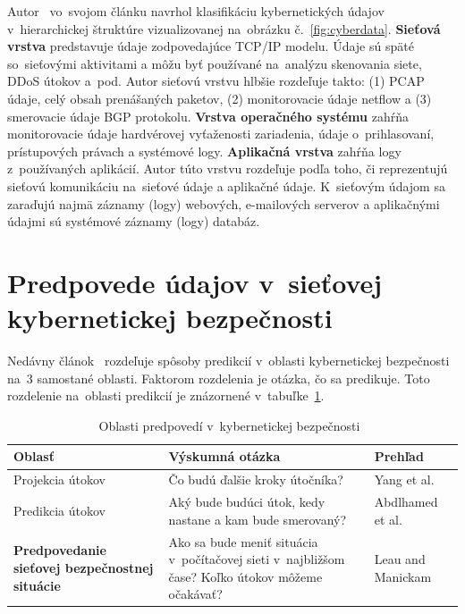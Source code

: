 \documentclass[thesismargins, thesislinespacing, openright, upjsfrontpage]{rnthesis}
\begin{document}
Autor~\cite{wang2013cyber} vo~svojom článku navrhol klasifikáciu kybernetických údajov v~hierarchickej štruktúre vizualizovanej na~obrázku č.~\ref{fig:cyberdata}. \textbf{Sieťová vrstva} predstavuje údaje zodpovedajúce TCP/IP modelu. Údaje sú späté so~sieťovými aktivitami a môžu byť používané na~analýzu skenovania siete, DDoS útokov a~pod. Autor sieťovú vrstvu hlbšie rozdeľuje takto: (1) PCAP údaje, celý obsah prenášaných paketov, (2) monitorovacie údaje netflow a (3) smerovacie údaje BGP protokolu. \textbf{Vrstva operačného systému} zahŕňa monitorovacie údaje hardvérovej vyťaženosti zariadenia, údaje o~prihlasovaní, prístupových právach a systémové logy. \textbf{Aplikačná vrstva} zahŕňa logy z~používaných aplikácií. Autor túto vrstvu rozdeľuje podľa toho, či reprezentujú sieťovú komunikáciu na~sieťové údaje a aplikačné údaje. K~sieťovým údajom sa zaraďujú najmä záznamy (logy) webových, e-mailových serverov a aplikačnými údajmi sú systémové záznamy (logy) databáz.


\section{Predpovede údajov v~sieťovej kybernetickej bezpečnosti} \label{discipliny}

Nedávny článok~\cite{Husak2018survey} rozdeľuje spôsoby predikcií v~oblasti kybernetickej bezpečnosti na~3 samostané oblasti. Faktorom rozdelenia je otázka, čo sa predikuje. Toto rozdelenie na~oblasti predikcií je znázornené v~tabuľke~\ref{Tab:husak}.

\begin{table}
\begin{center}
\begin{tabular}{ | p{4cm} | p{6cm} | p{3cm} | }
\hline
\textbf{Oblasť} & \textbf{Výskumná otázka} & \textbf{Prehľad} \\
\hline
\hline Projekcia útokov & Čo budú ďalšie kroky útočníka? & Yang et al.~\cite{Yang2014} \\
\hline Predikcia útokov & Aký bude budúci útok, kedy nastane a kam bude smerovaný? & Abdlhamed et al.~\cite{Abdlhamed2017} \\
\hline \textbf{Predpovedanie sieťovej bezpečnostnej situácie} & Ako sa bude meniť situácia v~počítačovej sieti v~najbližšom čase? Koľko útokov môžeme očakávať? & Leau and  Manickam~\cite{Leau2015} \\
\hline
\end{tabular}
\end{center}
\label{Tab:husak}
\caption{Oblasti predpovedí v~kybernetickej bezpečnosti~\cite{Husak2018survey}}
\end{table}
\end{document}

